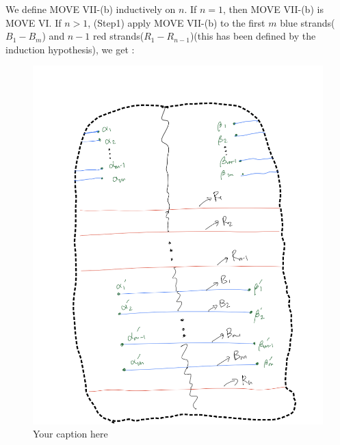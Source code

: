 We define MOVE \RN{7}-(b) inductively on $n$. If $n=1$, then MOVE \RN{7}-(b) is MOVE \RN{6}. If $n>1$, 
(Step1) apply MOVE \RN{7}-(b) to the first $m$ blue strands($B_1 - B_m$) and $n-1$ red strands($R_1 - R_{n-1}$)(this has been defined by the induction hypothesis), we get :
\begin{figure}[H] %
    \centering
    \includegraphics[width=\linewidth]{diagrams/definition7/7.png} %
    \caption{Your caption here}
    \label{fig:your-label}
\end{figure}

